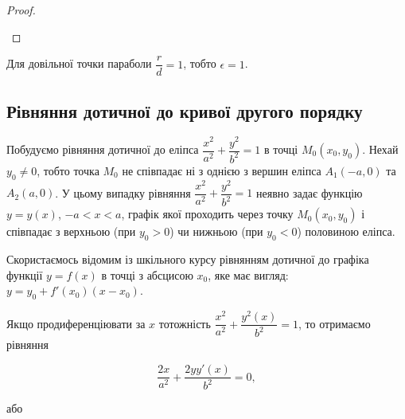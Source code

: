 \begin{proof}
\begin{center}
	\end{center}
	
\end{proof}

\begin{remark}
	 Для довільної точки параболи $\dfrac{r}{d} = 1$, тобто $\epsilon = 1$. 
\end{remark}

\subsection{Рівняння дотичної до кривої другого порядку}

Побудуємо рівняння дотичної до еліпса $\dfrac{x^2}{a^2} + \dfrac{y^2}{b^2} = 1$ в точці $M_0(x_0,y_0)$.
Нехай $y_0 \neq 0$, тобто точка $M_0$ не співпадає ні з однією з вершин еліпса $A_1(-a,0)$
та $A_2(a,0)$. У цьому випадку рівняння $\dfrac{x^2}{a^2} + \dfrac{y^2}{b^2} = 1$ неявно задає функцію $y = y(x)$,
$-a < x < a$, графік якої проходить через точку $M_0(x_0,y_0)$ і співпадає з верхньою
(при $y_0 > 0$) чи нижньою (при $y_0 < 0$) половиною еліпса.

Скористаємось відомим із шкільного курсу рівнянням дотичної до графіка
функції $y = f(x)$ в точці з абсцисою $x_0$, яке має вигляд: $y = y_0 + f'(x_0)(x - x_0)$.

Якщо продиференціювати за $x$ тотожність $\dfrac{x^2}{a^2} + \dfrac{y^2(x)}{b^2} = 1$, то отримаємо
рівняння 

$$\dfrac{2x}{a^2} + \dfrac{2yy'(x)}{b^2} = 0,$$ 

\begin{center}
або
\end{center}

